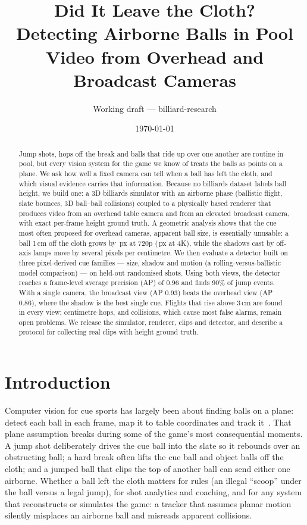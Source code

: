 \documentclass[11pt]{article}
\title{Did It Leave the Cloth?\\Detecting Airborne Balls in Pool Video from Overhead and Broadcast Cameras}
\author{Working draft --- billiard-research}
\date{\today}
\begin{document}
\maketitle

\begin{abstract}
Jump shots, hops off the break and balls that ride up over one another are
routine in pool, but every vision system for the game we know of treats the
balls as points on a plane. We ask how well a fixed camera can tell when a
ball has left the cloth, and which visual evidence carries that information.
Because no billiards dataset labels ball height, we build one: a 3D billiards
simulator with an airborne phase (ballistic flight, slate bounces, 3D
ball--ball collisions) coupled to a physically based renderer that produces
video from an overhead table camera and from an elevated broadcast camera,
with exact per-frame height ground truth. A geometric analysis shows that the
cue most often proposed for overhead cameras, apparent ball size, is
essentially unusable: a ball 1\,cm off the cloth grows by
\GEOsizeOvTen\,px at 720p (\GEOsizeFourKTen\,px at 4K), while the shadows cast by off-axis lamps
move by several pixels per centimetre. We then evaluate a detector built on three
pixel-derived cue families --- size, shadow and motion (a rolling-versus-ballistic
model comparison) --- on \NumTest{} held-out randomised shots.
Using both views, the detector reaches a frame-level average precision (AP)
of 0.96 and finds 90\% of jump events. With a single camera, the broadcast
view (AP 0.93) beats the overhead view (AP 0.86), where the shadow is the best
single cue. Flights that rise above 3\,cm are found in every view; centimetre
hops, and collisions, which cause most false alarms, remain open problems.
We release the simulator, renderer, clips and detector, and describe a
protocol for collecting real clips with height ground truth.
\end{abstract}

\section{Introduction}

Computer vision for cue sports has largely been about finding balls on a
plane: detect each ball in each frame, map it to table coordinates and track
it~\citep{roboflow2023pool}. That plane assumption breaks during some of the
game's most consequential moments. A jump shot deliberately drives the cue
ball into the slate so it rebounds over an obstructing ball; a hard break
often lifts the cue ball and object balls off the cloth; and a jumped ball that
clips the top of another ball can send either one airborne. Whether a ball
left the cloth matters for rules (an illegal ``scoop'' under the ball versus a
legal jump), for shot analytics and coaching, and for any system that
reconstructs or simulates the game: a tracker that assumes planar motion
silently misplaces an airborne ball and misreads apparent collisions.
\end{document}
